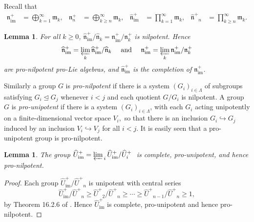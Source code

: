 \documentclass[11pt,letterpaper]{amsart}
\newcounter{thecounter}
\numberwithin{thecounter}{section}
\newtheorem{lemma}[thecounter]{Lemma}
\theoremstyle{definition}
\DeclareMathOperator{\ad}{ad}
\DeclareMathOperator{\im}{{im}}
\newcommand{\Uhp}{{\widehat{U}^+}}
\newcommand{\Uhimp}{{\widehat{U}_{\im}^+}}
\newcommand{\nh}{\widehat{\mathfrak{n}}}
\newcommand{\nhp}{{\widehat{\mathfrak{n}}^+}}
\newcommand{\nimp}{{\mathfrak{n}_{\im}^+}}
\newcommand{\nhimp}{{\widehat{\mathfrak{n}}_{\im}^+}}
\begin{document}
Recall that
\begin{align*}
\nimp &= \bigoplus_{k=1}^\infty \mathfrak{m}_k, & \mathfrak{n}^+_n &= \bigoplus_{k\geq n}^\infty \mathfrak{m}_k,&
\nhimp &= \prod_{k=1}^\infty \mathfrak{m}_k, & \nhp_n &= \prod_{k\geq n}^\infty \mathfrak{m}_k.
\end{align*}
\begin{lemma}\label{nilpotent} 
For all $k\ge0$, $\nhimp/\nh_k= \nimp/{\mathfrak{n}}_k^+$
is nilpotent. Hence $$\nhimp=\varprojlim_k \nhimp/\nh_k\quad\text{ and }\quad \nimp=\varprojlim_k\nimp/{\mathfrak{n}}_k^+$$ are pro-nilpotent pro-Lie algebras, and $\nhimp$ is the completion of $\nimp$.
\end{lemma}

Similarly a group $G$ is {\it pro-nilpotent}  if there is a system $({G}_i)_{i\in \Lambda}$ of  subgroups satisfying ${G}_i\unlhd{G}_j$ whenever $i<j$ and each quotient ${G}/{G}_i$ is nilpotent.
A group $G$ is {\it pro-unipotent} if there is a system $({G}_i)_{i\in \Lambda}$, with each $G_i$
acting unipotently on a 
finite-dimensional vector space $V_i,$ so that there is an inclusion $G_i\hookrightarrow G_j$ induced by an inclusion 
$V_i \hookrightarrow V_j$ for all $i<j$.
It is easily seen that a pro-unipotent group is pro-nilpotent.

\begin{lemma}\label{L-Uhat-pro-nilp} The group
 $
\Uhimp = \varprojlim_{\,i} \Uhimp/\Uhp_i\
$
is complete, pro-unipotent, and  hence pro-nilpotent. 
\end{lemma}

\begin{longver}
\begin{proof} 
Each group $\Uhimp/\Uhp_n$ is unipotent with central series
$$
 \Uhimp /\Uhp_n\ge\Uhp_2/\Uhp_n\ge\cdots \ge\Uhp_{n-1}/\Uhp_n\ge1,
$$
by Theorem 16.2.6 of \cite{Springer}. 
Hence $\Uhimp $ is complete, pro-unipotent and hence pro-nilpotent.
\end{proof}
\end{longver}


\end{document}
